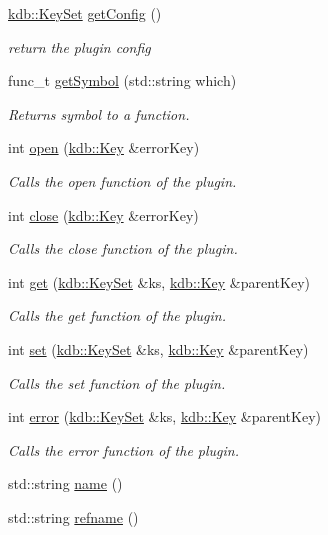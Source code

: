 \begin{DoxyCompactItemize}
\hyperlink{classkdb_1_1KeySet}{kdb\+::\+Key\+Set} \hyperlink{classkdb_1_1tools_1_1Plugin_af3004444f5ef05dc8106646ff2b95694}{get\+Config} ()
\begin{DoxyCompactList}\small\item\em return the plugin config \end{DoxyCompactList}\item 
func\+\_\+t \hyperlink{classkdb_1_1tools_1_1Plugin_aca31140802ab463d5bddd95dee73194d}{get\+Symbol} (std\+::string which)
\begin{DoxyCompactList}\small\item\em Returns symbol to a function. \end{DoxyCompactList}\item 
int \hyperlink{classkdb_1_1tools_1_1Plugin_a680a490123b5290441d76ef2c1e3f1fa}{open} (\hyperlink{classkdb_1_1Key}{kdb\+::\+Key} \&error\+Key)
\begin{DoxyCompactList}\small\item\em Calls the open function of the plugin. \end{DoxyCompactList}\item 
int \hyperlink{classkdb_1_1tools_1_1Plugin_a40b5fd413f3f6da735680ed8d7c8a6a2}{close} (\hyperlink{classkdb_1_1Key}{kdb\+::\+Key} \&error\+Key)
\begin{DoxyCompactList}\small\item\em Calls the close function of the plugin. \end{DoxyCompactList}\item 
int \hyperlink{classkdb_1_1tools_1_1Plugin_a2aa6ff55f9cf81a59d2a8d271fe68e0f}{get} (\hyperlink{classkdb_1_1KeySet}{kdb\+::\+Key\+Set} \&ks, \hyperlink{classkdb_1_1Key}{kdb\+::\+Key} \&parent\+Key)
\begin{DoxyCompactList}\small\item\em Calls the get function of the plugin. \end{DoxyCompactList}\item 
int \hyperlink{classkdb_1_1tools_1_1Plugin_abf84d512b48f6fa1b89636217537cde0}{set} (\hyperlink{classkdb_1_1KeySet}{kdb\+::\+Key\+Set} \&ks, \hyperlink{classkdb_1_1Key}{kdb\+::\+Key} \&parent\+Key)
\begin{DoxyCompactList}\small\item\em Calls the set function of the plugin. \end{DoxyCompactList}\item 
int \hyperlink{classkdb_1_1tools_1_1Plugin_a8ec348b49a34ef17fda64cb289b8cf64}{error} (\hyperlink{classkdb_1_1KeySet}{kdb\+::\+Key\+Set} \&ks, \hyperlink{classkdb_1_1Key}{kdb\+::\+Key} \&parent\+Key)
\begin{DoxyCompactList}\small\item\em Calls the error function of the plugin. \end{DoxyCompactList}\item 
std\+::string \hyperlink{classkdb_1_1tools_1_1Plugin_ae4b82f943d0cdb0dd355924aa3201d6f}{name} ()
\item 
std\+::string \hyperlink{classkdb_1_1tools_1_1Plugin_af2fa892b6a8861419b1c1c2b3d39ed1e}{refname} ()
\end{DoxyCompactItemize}
